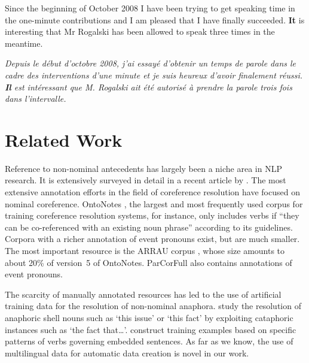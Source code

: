 \documentclass[10pt, a4paper]{article}
\begin{document}
\begin{enumerate}
Since the beginning of October 2008 I have been trying to get speaking time in
the one-minute contributions and I am pleased that I have finally succeeded.
\textbf{It} is interesting that Mr Rogalski has been allowed to speak three times in the meantime. 


\textit{Depuis le début d'octobre 2008, j'ai essayé d'obtenir un temps de parole
dans le cadre des interventions d'une minute et je suis heureux d'avoir
finalement réussi. \textbf{Il} est intéressant que M. Rogalski ait été autorisé à prendre la parole trois fois dans l'intervalle.}





\end{enumerate}



\section{Related Work}

Reference to non-nominal antecedents has largely been a niche area in NLP
research. It is extensively surveyed in detail in a recent article by
. The most extensive annotation efforts in
the field of coreference resolution have focused on nominal coreference.
OntoNotes \cite{Pradhan:2013}, the largest and most frequently used corpus for
training coreference resolution systems, for instance, only includes verbs if
``they can be co-referenced with an existing noun phrase'' according to its
guidelines. Corpora with a richer annotation of event pronouns exist, but are
much smaller. The most important resource is the ARRAU corpus
\cite{poesio-etal-2018-anaphora}, whose size amounts to about 20\% of version~5
of OntoNotes. ParCorFull \cite{Lapshinova-Koltunski-Hardmeier-Krielke2018} also
contains annotations of event pronouns.

The scarcity of manually annotated resources has led to the use of artificial
training data for the resolution of non-nominal anaphora.
 study the resolution of anaphoric
shell nouns such as `this issue' or `this fact' by exploiting
cataphoric instances such as `the fact that\ldots'.
 construct training examples based on
specific patterns of verbs governing embedded sentences. As far as we know, the
use of multilingual data for automatic data creation is novel in our work.
\end{document}
